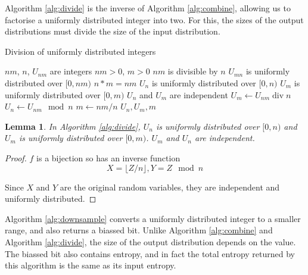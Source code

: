 \documentclass[12pt]{article}
\newtheorem{lemma}{Lemma}
\begin{document}
Algorithm \ref{alg:divide} is the inverse of Algorithm \ref{alg:combine}, allowing us to factorise a uniformly distributed integer into two. For this, the sizes of the output distributions must divide the size of the input distribution.

\begin{algorithm}
\caption{Division of uniformly distributed integers}
\label{alg:divide}
\begin{algorithmic}[1]
    \Require $nm$, $n$, $U_{nm}$ are integers
    \Require $nm>0$, $m>0$
    \Require $nm$ is divisible by $n$
    \Require $U_{mn}$ is uniformly distributed over $[0,nm)$
    \Ensure $n * m = nm$
    \Ensure $U_{n}$ is uniformly distributed over $[0,n)$
    \Ensure $U_{m}$ is uniformly distributed over $[0,m)$
    \Ensure $U_n$ and $U_m$ are independent
  \State $U_m \gets U_{nm} \operatorname{div} n$
  \State $U_{n} \gets U_{nm} \mod n$
  \State $m \gets nm / n$
  \State \Return $U_n, U_m, m$
\EndProcedure
\end{algorithmic}
\end{algorithm}

\begin{lemma}
In Algorithm \ref{alg:divide}, $U_n$ is uniformly distributed over $[0,n)$ and $U_m$ is uniformly distributed over $[0,m)$. $U_m$ and $U_n$ are independent.

\label{lem:divide}
\end{lemma}

\begin{proof} $f$ is a bijection so has an inverse function 
\begin{equation}    
X = \lfloor Z/n \rfloor, Y = Z \mod n
\end{equation}

Since $X$ and $Y$ are the original random variables, they are independent and uniformly distributed.
\end{proof}

Algorithm \ref{alg:downsample} converts a uniformly distributed integer to a smaller range, and also returns a biassed bit. Unlike Algorithm \ref{alg:combine} and Algorithm \ref{alg:divide}, the size of the output distribution depends on the value. The biassed bit also contains entropy, and in fact the total entropy returned by this algorithm is the same as its input entropy.
\end{document}
